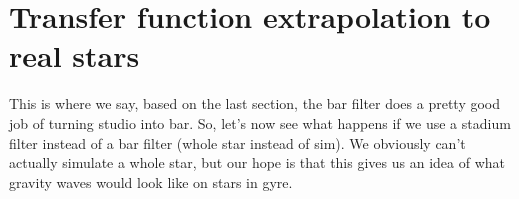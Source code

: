 \section{Transfer function extrapolation to real stars}
\label{sec:transfer_extrapolation}

This is where we say, based on the last section, the bar filter does a pretty good job of turning studio into bar.
So, let's now see what happens if we use a stadium filter instead of a bar filter (whole star instead of sim).
We obviously can't actually simulate a whole star, but our hope is that this gives us an idea of what gravity waves would look like on stars in gyre.


